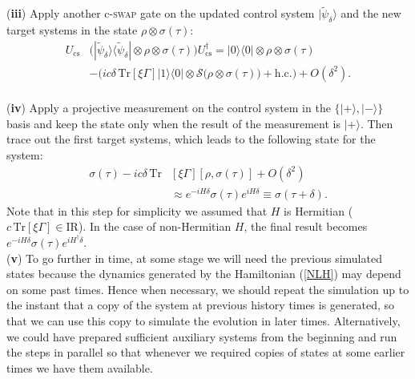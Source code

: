 \documentclass[aps,pra,twocolumn,floatfix,groupedaddress,superscriptaddress,nofootinbib,notitlepage]{revtex4-2}
\begin{document}
(\textbf{iii}) Apply another c-\textsc{swap} gate on the updated control system $|\tilde{\psi}_{\delta}\rangle$ and the new target systems in the state $\rho\otimes \sigma(\tau)$:
\begin{align}
U_{\text{cs}}& \big(|\tilde{\psi}_{\delta}\rangle\langle \tilde{\psi}_{\delta}|\otimes \rho\otimes \sigma(\tau)\big) U^{\dag}_{\text{cs}}=|0\rangle\langle 0|\otimes \rho\otimes \sigma(\tau) \nonumber\\
&-\Big(ic\delta\, \mathrm{Tr}[\xi\Gamma] |1\rangle\langle 0|\otimes \mathcal{S}\big(\rho\otimes \sigma(\tau)\big)+ \mathrm{h.c.}\Big) + O(\delta^{2}).
\end{align}
\\

(\textbf{iv}) Apply a projective measurement on the control system in the $\{|+\rangle, |-\rangle\}$ basis and keep the state only when the result of the measurement is $|+\rangle$. Then trace out the first target systems, which leads to the following state for the system:
\begin{align}
\sigma(\tau)-ic\delta\, \mathrm{Tr}&[\xi\Gamma][\rho,\sigma(\tau)] + O(\delta^{2}) \nonumber\\
& \approx e^{-i H \delta} \sigma(\tau) e^{i H\delta}  \equiv \sigma(\tau+\delta).
\end{align}
Note that in this step for simplicity we assumed that $H$ is Hermitian ($c\,\mathrm{Tr}[\xi\Gamma]\in\mathrm{I\!R}$). In the case of non-Hermitian $H$, the final result becomes $e^{-i H \delta} \sigma(\tau) e^{i H^{\dag}\delta}$.\\

(\textbf{v}) To go further in time, at some stage we will need the previous simulated states because the dynamics generated by the Hamiltonian (\ref{NLH}) may depend on some past times. Hence when necessary, we should repeat the simulation up to the instant that a copy of the system at previous history times is generated, so that we can use this copy to simulate the evolution in later times. Alternatively, we could have prepared sufficient auxiliary systems from the beginning and run the steps in parallel so that whenever we required copies of states at some earlier times we have them available.\\
\end{document}
